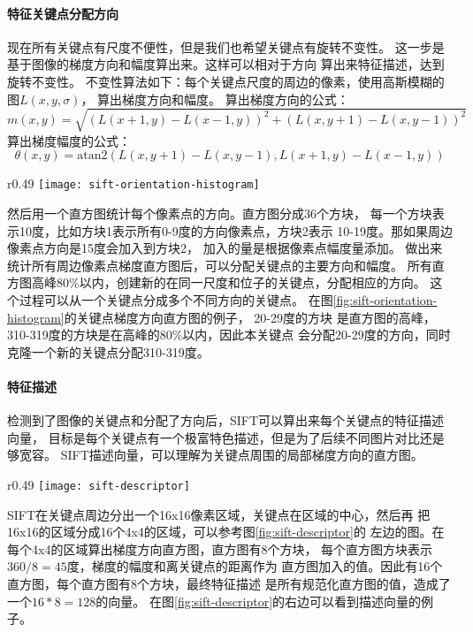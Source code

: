 \paragraph*{特征关键点分配方向}
现在所有关键点有尺度不便性，但是我们也希望关键点有旋转不变性。
这一步是基于图像的梯度方向和幅度算出来。这样可以相对于方向
算出来特征描述，达到旋转不变性。
不变性算法如下：每个关键点尺度的周边的像素，使用高斯模糊的图$L \left( x, y, \sigma \right)$，
算出梯度方向和幅度。
算出梯度方向的公式：$$m \left( x, y \right) = \sqrt{\left( L \left( x+1, y \right) - L \left( x-1, y \right) \right)^2 
                  + \left( L \left( x, y+1 \right) - L \left( x, y-1 \right) \right)^2}$$
算出梯度幅度的公式：$$\theta \left( x, y \right) = \mathrm{atan2}\left(L \left( x, y+1 \right) - L \left( x, y-1 \right),
               L \left( x+1, y \right) - L \left( x-1, y \right) \right)$$
\begin{wrapfigure}{r}{0.49\textwidth}
  \centering
    \texttt{[image: sift-orientation-histogram]}
    \caption{SIFT关键点梯度直方图例子。 \\
             图片源：\cite{aishack:sift-orientation}}
  \label{fig:sift-orientation-histogram}
\end{wrapfigure}
然后用一个直方图统计每个像素点的方向。直方图分成36个方块，
每一个方块表示10度，比如方块1表示所有0-9度的方向像素点，方块2表示
10-19度。那如果周边像素点方向是15度会加入到方块2，
加入的量是根据像素点幅度量添加。
做出来统计所有周边像素点梯度直方图后，可以分配关键点的主要方向和幅度。
所有直方图高峰80\%以内，创建新的在同一尺度和位子的关键点，分配相应的方向。
这个过程可以从一个关键点分成多个不同方向的关键点。
在图\ref{fig:sift-orientation-histogram}的关键点梯度方向直方图的例子，
20-29度的方块 是直方图的高峰，310-319度的方块是在高峰的80\%以内，因此本关键点
会分配20-29度的方向，同时克隆一个新的关键点分配310-319度。

\paragraph*{特征描述}
检测到了图像的关键点和分配了方向后，SIFT可以算出来每个关键点的特征描述向量，
目标是每个关键点有一个极富特色描述，但是为了后续不同图片对比还是够宽容。
SIFT描述向量，可以理解为关键点周围的局部梯度方向的直方图。

\begin{wrapfigure}{r}{0.49\textwidth}
  \centering
    \texttt{[image: sift-descriptor]}
    \caption{SIFT特征描述。源：Cornell CS664}
  \label{fig:sift-descriptor}
\end{wrapfigure}
SIFT在关键点周边分出一个16x16像素区域，关键点在区域的中心，然后再
把16x16的区域分成16个4x4的区域，可以参考图\ref{fig:sift-descriptor}的
左边的图。在每个4x4的区域算出梯度方向直方图，直方图有8个方块，
每个直方图方块表示$360 / 8 = 45$度，梯度的幅度和离关键点的距离作为
直方图加入的值。因此有16个直方图，每个直方图有8个方块，最终特征描述
是所有规范化直方图的值，造成了一个$16 * 8 = 128$的向量。
在图\ref{fig:sift-descriptor}的右边可以看到描述向量的例子。


